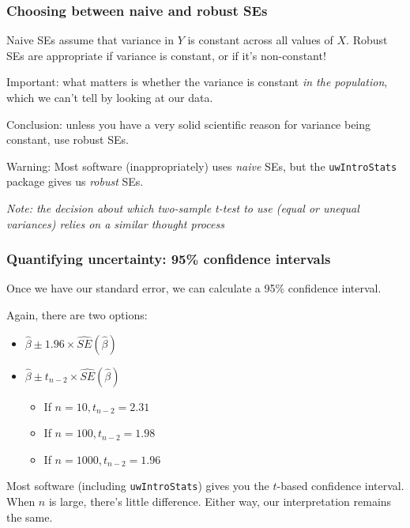 \documentclass[12pt, 
hyperref={colorlinks=true, linkcolor=blue, urlcolor=cyan},dvipsnames]{beamer}
\begin{document}
\begin{frame}
\frametitle{Choosing between naive and robust SEs}

Naive SEs assume that variance in $Y$ is constant across all values of $X$. Robust SEs are appropriate if variance is constant, or if it's non-constant!

\color{blue} Important: \color{black} what matters is whether the variance is constant \textit{in the population}, which we can't tell by looking at our data.

\color{blue} Conclusion: \color{black} unless you have a very solid scientific reason for variance being constant, use robust SEs.

\color{red} Warning: \color{black} Most software (inappropriately) uses \textit{naive} SEs, but the \texttt{uwIntroStats} package gives us \textit{robust} SEs. %

\begin{footnotesize} \textit{Note: the decision about which two-sample t-test to use (equal or unequal variances) relies on a similar thought process} \end{footnotesize}
\end{frame}


\begin{frame}
\frametitle{Quantifying uncertainty: 95\% confidence intervals}

Once we have our standard error, we can calculate a 95\% confidence interval. 

Again, there are two options: \vspace{-0.3cm}
\begin{itemize}
\item $\hat{\beta} \pm 1.96 \times \widehat{SE}(\hat\beta)$
\item $\hat{\beta} \pm t_{n-2} \times \widehat{SE}(\hat\beta)$
	\begin{itemize}
	\item If $n = 10, t_{n-2} = 2.31$
	\item If $n = 100, t_{n-2} = 1.98$
	\item If $n = 1000, t_{n-2} = 1.96$
	\end{itemize}
\end{itemize}

Most software (including \texttt{uwIntroStats}) gives you the $t$-based confidence interval. When $n$ is large, there's little difference. Either way, our interpretation remains the same.

\end{frame}
\end{document}
